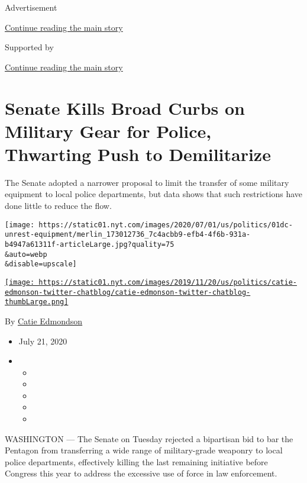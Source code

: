 Advertisement

\protect\hyperlink{after-top}{Continue reading the main story}

Supported by

\protect\hyperlink{after-sponsor}{Continue reading the main story}

\hypertarget{senate-kills-broad-curbs-on-military-gear-for-police-thwarting-push-to-demilitarize}{%
\section{Senate Kills Broad Curbs on Military Gear for Police, Thwarting
Push to
Demilitarize}\label{senate-kills-broad-curbs-on-military-gear-for-police-thwarting-push-to-demilitarize}}

The Senate adopted a narrower proposal to limit the transfer of some
military equipment to local police departments, but data shows that such
restrictions have done little to reduce the flow.

\texttt{[image: https://static01.nyt.com/images/2020/07/01/us/politics/01dc-unrest-equipment/merlin\_173012736\_7c4acbb9-efb4-4f6b-931a-b4947a61311f-articleLarge.jpg?quality=75\\\&auto=webp\\\&disable=upscale]}

\href{https://www.nytimes.com/by/catie-edmondson}{\texttt{[image: https://static01.nyt.com/images/2019/11/20/us/politics/catie-edmonson-twitter-chatblog/catie-edmonson-twitter-chatblog-thumbLarge.png]}}

By \href{https://www.nytimes.com/by/catie-edmondson}{Catie Edmondson}

\begin{itemize}
\item
  July 21, 2020
\item
  \begin{itemize}
  \item
  \item
  \item
  \item
  \item
  \end{itemize}
\end{itemize}

WASHINGTON --- The Senate on Tuesday rejected a bipartisan bid to bar
the Pentagon from transferring a wide range of military-grade weaponry
to local police departments, effectively killing the last remaining
initiative before Congress this year to address the excessive use of
force in law enforcement.

